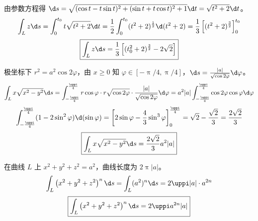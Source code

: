 \begin{solution}

    由参数方程得 $\d s = \sqrt{(\cos t - t \sin t)^{2} + (\sin t + t \cos t)^{2} + 1} \d t = \sqrt{t^{2}+2} \d t$。
    \begin{equation}
        \int_{L} z \d s = \int_{0}^{t_{0}} t \sqrt{t^{2}+2} \d t = \frac{1}{2} \int_{0}^{t_{0}} (t^{2}+2)^{\frac{1}{2}} \d(t^{2}+2) = \frac{1}{3} \left[ (t^{2}+2)^{\frac{3}{2}} \right]_{0}^{t_{0}}
    \end{equation}
    \begin{equation}
        \boxed{\int_{L} z \d s = \frac{1}{3} \left[ (t_{0}^{2}+2)^{\frac{3}{2}} - 2 \sqrt{2} \right]}
    \end{equation}


    极坐标下 $r^{2} = a^{2} \cos 2 \varphi$，由 $x \geqslant 0$ 知 $\varphi \in [-\uppi/4, \uppi/4]$，$\d s = \frac{|a|}{\sqrt{\cos 2 \varphi}} \d \varphi$。
    \begin{equation}
        \int_{L} x \sqrt{x^{2}-y^{2}} \d s = \int_{-\frac{\uppi}{4}}^{\frac{\uppi}{4}} r \cos \varphi \cdot r \sqrt{\cos 2 \varphi} \cdot \frac{|a|}{\sqrt{\cos 2 \varphi}} \d \varphi = a^{2} |a| \int_{-\frac{\uppi}{4}}^{\frac{\uppi}{4}} \cos 2 \varphi \cos \varphi \d \varphi
    \end{equation}
    \begin{equation}
        \int_{-\frac{\uppi}{4}}^{\frac{\uppi}{4}} (1-2\sin^{2} \varphi) \d (\sin \varphi) = \left[ 2 \sin \varphi - \frac{4}{3} \sin^{3} \varphi \right]_{0}^{\frac{\uppi}{4}} = \sqrt{2} - \frac{\sqrt{2}}{3} = \frac{2\sqrt{2}}{3}
    \end{equation}
    \begin{equation}
        \boxed{\int_{L} x \sqrt{x^{2}-y^{2}} \d s = \frac{2 \sqrt{2}}{3} a^{2} |a|}
    \end{equation}


    在曲线 $L$ 上 $x^{2}+y^{2}+z^{2} = a^{2}$，曲线长度为 $2 \uppi |a|$。
    \begin{equation}
        \int_{L}\left(x^{2}+y^{2}+z^{2}\right)^{n} \d s = \int_{L}(a^{2})^{n} \d s = 2 \uppi |a| \cdot a^{2n}
    \end{equation}
    \begin{equation}
        \boxed{\int_{L}\left(x^{2}+y^{2}+z^{2}\right)^{n} \d s = 2 \uppi a^{2n} |a|}
    \end{equation}



\end{solution}
